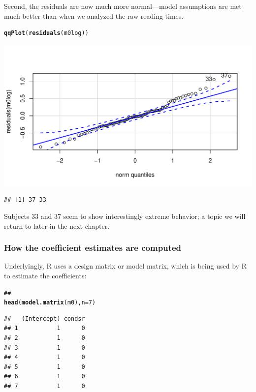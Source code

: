 \documentclass[12pt]{book}\usepackage[]{graphicx}\usepackage[]{color}
\makeatletter
\def\maxwidth{ %
  \ifdim\Gin@nat@width>\linewidth
    \linewidth
  \else
    \Gin@nat@width
  \fi
}
\newcommand{\hlnum}[1]{\textcolor[rgb]{0.686,0.059,0.569}{#1}}%
\newcommand{\hlcom}[1]{\textcolor[rgb]{0.678,0.584,0.686}{\textit{#1}}}%
\newcommand{\hlstd}[1]{\textcolor[rgb]{0.345,0.345,0.345}{#1}}%
\newcommand{\hlkwc}[1]{\textcolor[rgb]{0.333,0.667,0.333}{#1}}%
\newcommand{\hlkwd}[1]{\textcolor[rgb]{0.737,0.353,0.396}{\textbf{#1}}}%
\newenvironment{kframe}{%
 \def\at@end@of@kframe{}%
 \ifinner\ifhmode%
  \def\at@end@of@kframe{\end{minipage}}%
  \begin{minipage}{\columnwidth}%
 \fi\fi%
 \def\FrameCommand##1{\hskip\@totalleftmargin \hskip-\fboxsep
 \colorbox{shadecolor}{##1}\hskip-\fboxsep
     \hskip-\linewidth \hskip-\@totalleftmargin \hskip\columnwidth}%
 \MakeFramed {\advance\hsize-\width
   \@totalleftmargin\z@ \linewidth\hsize
   \@setminipage}}%
 {\par\unskip\endMakeFramed%
 \at@end@of@kframe}
\newenvironment{knitrout}{}{} %
\makeatother
\begin{document}
Second, the residuals are now much more normal---model assumptions are met much better than when we analyzed the raw reading times.

\begin{knitrout}
\color{fgcolor}\begin{kframe}
\begin{alltt}
\hlkwd{qqPlot}\hlstd{(}\hlkwd{residuals}\hlstd{(m0log))}
\end{alltt}
\end{kframe}
\includegraphics[width=\maxwidth]{figure/unnamed-chunk-94-1} 
\begin{kframe}\begin{verbatim}
## [1] 37 33
\end{verbatim}
\end{kframe}
\end{knitrout}

Subjects 33 and 37 seem to show interestingly extreme behavior; a topic we will return to later in the next chapter.

\subsubsection{How the coefficient estimates are computed}

Underlyingly, R uses a design matrix or model matrix, which is being used by R to estimate the coefficients:

\begin{knitrout}
\color{fgcolor}\begin{kframe}
\begin{alltt}
\hlcom{##}
\hlkwd{head}\hlstd{(}\hlkwd{model.matrix}\hlstd{(m0),}\hlkwc{n}\hlstd{=}\hlnum{7}\hlstd{)}
\end{alltt}
\begin{verbatim}
##   (Intercept) condsr
## 1           1      0
## 2           1      0
## 3           1      0
## 4           1      0
## 5           1      0
## 6           1      0
## 7           1      0
\end{verbatim}
\end{kframe}
\end{knitrout}
\end{document}
